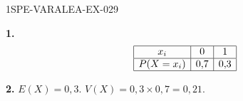 \begin{corrige}{1SPE-VARALEA-EX-029}

\textbf{1.}
\[
\begin{array}{|c|c|c|}
\hline
x_i & 0 & 1 \\
\hline
P(X=x_i) & 0{,}7 & 0{,}3 \\
\hline
\end{array}
\]

\medskip
\textbf{2.} $E(X) = 0{,}3$. \quad $V(X) = 0{,}3 \times 0{,}7 = 0{,}21$.

\end{corrige}
